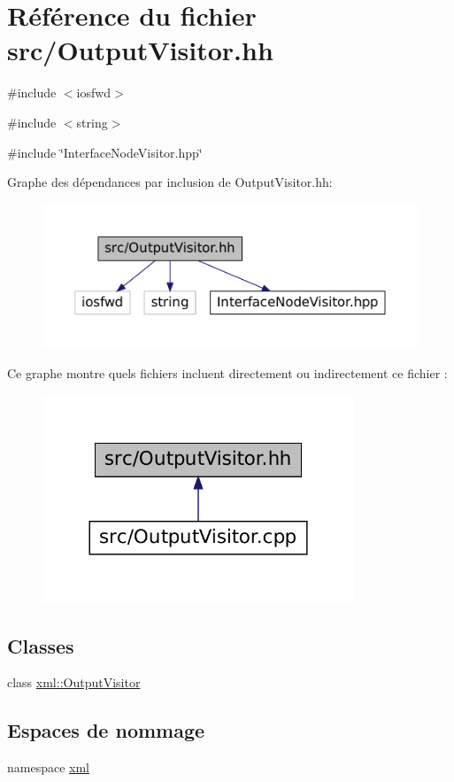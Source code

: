 \hypertarget{_output_visitor_8hh}{
\section{Référence du fichier src/OutputVisitor.hh}
\label{_output_visitor_8hh}
}
{\ttfamily \#include $<$iosfwd$>$}\par
{\ttfamily \#include $<$string$>$}\par
{\ttfamily \#include \char`\"{}InterfaceNodeVisitor.hpp\char`\"{}}\par
Graphe des dépendances par inclusion de OutputVisitor.hh:\nopagebreak
\begin{figure}[H]
\begin{center}
\leavevmode
\includegraphics[width=400pt]{_output_visitor_8hh__incl}
\end{center}
\end{figure}
Ce graphe montre quels fichiers incluent directement ou indirectement ce fichier :\nopagebreak
\begin{figure}[H]
\begin{center}
\leavevmode
\includegraphics[width=264pt]{_output_visitor_8hh__dep__incl}
\end{center}
\end{figure}
\subsection*{Classes}
\begin{DoxyCompactItemize}
\item 
class \hyperlink{classxml_1_1_output_visitor}{xml::OutputVisitor}
\end{DoxyCompactItemize}
\subsection*{Espaces de nommage}
\begin{DoxyCompactItemize}
\item 
namespace \hyperlink{namespacexml}{xml}
\end{DoxyCompactItemize}
